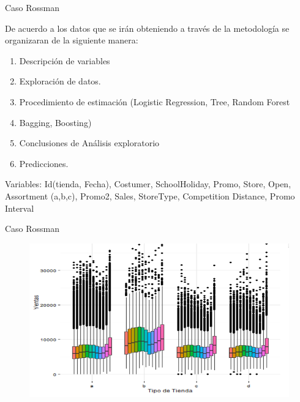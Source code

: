 \documentclass{bredelebeamer}
\begin{document}
\begin{frame}{Caso Rossman}

De acuerdo a los datos que se irán obteniendo a través de la metodología se
organizaran de la siguiente manera:

\vspace{.75cm}

\begin{enumerate}
  \item Descripción de variables
  \item Exploración de datos.
  \item Procedimiento de estimación (Logistic Regression, Tree, Random Forest
  \item Bagging, Boosting)
  \item Conclusiones de Análisis exploratorio
  \item Predicciones.
\end{enumerate}

\vspace{.75cm}

Variables: Id(tienda, Fecha), Costumer, SchoolHoliday, Promo, Store, Open,
Assortment (a,b,c), Promo2, Sales, StoreType, Competition Distance, Promo Interval


\end{frame}


\begin{frame}{Caso Rossman}

\begin{figure}[H]
\centering
\includegraphics[scale=.35]{images/Zuri5.png}
\end{figure}

\end{frame}
\end{document}
